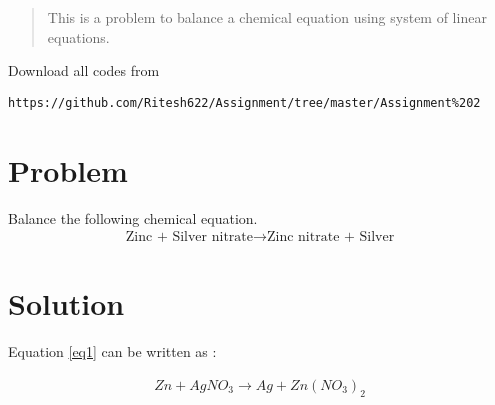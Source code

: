 \documentclass[journal,12pt,twocolumn]{IEEEtran}
\begin{document}
\maketitle
\newpage
\bigskip
\renewcommand{\thefigure}{\theenumi}
\renewcommand{\thetable}{\theenumi}
\begin{abstract}
This is a problem to balance a chemical equation using system of linear equations.
\end{abstract}
Download all  codes from 
\begin{lstlisting}
https://github.com/Ritesh622/Assignment/tree/master/Assignment%202
\end{lstlisting}
%

\section{Problem}
    Balance the following chemical equation.
    \begin{align}
        \label{eq1} \text{Zinc + Silver nitrate} \to \text{Zinc nitrate + Silver}
    \end{align}
    
\section{Solution}

Equation \ref{eq1}  can be written as :

\begin{align}
\label{eq2} Zn+ AgNO_{3} \to Ag + Zn(NO_{3})_{2}
\end{align}
\end{document}
